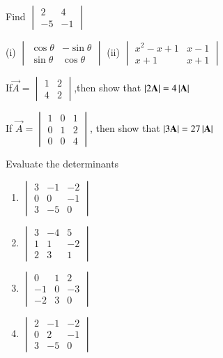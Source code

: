 
\item Find 
$\begin{vmatrix}
2&4\\-5&-1
\end{vmatrix}$
\\
\solution 


\item (i) $\begin{vmatrix}\cos\theta& -\sin\theta\\ \sin\theta& \cos\theta \end{vmatrix}$ 
(ii) $\begin{vmatrix}
x^2-x+1& x-1\\ x+1&  x+1
\end{vmatrix}$
\\
\solution 

\item If$ \vec{A} = \begin{vmatrix}1&2\\4&2\end{vmatrix}$,then show that  
$\left\vert2\mathbf{A}\right\vert=4\left\vert\mathbf{A}\right\vert$
\\
\solution 

\item If $\vec{A}=\begin{vmatrix}1&0&1\\0&1&2\\0&0&4\end{vmatrix}$, then show that $\left\vert3\mathbf{A}\right\vert=27\left\vert\mathbf{A}\right\vert$
\\
\solution 

\item Evaluate the determinants
\begin{enumerate}
\item $\begin{vmatrix}
3&-1&-2\\0&0&-1\\3&-5&0
\end{vmatrix}$
\item $\begin{vmatrix}
3&-4&5\\1&1&-2\\2&3&1
\end{vmatrix}$
\\
\solution 

\item $\begin{vmatrix}
0&1&2 \\ -1&0&-3\\-2&3&0
\end{vmatrix}$
\item $\begin{vmatrix}
2&-1&-2\\0&2&-1\\3&-5&0
\end{vmatrix}$
\end{enumerate}  
